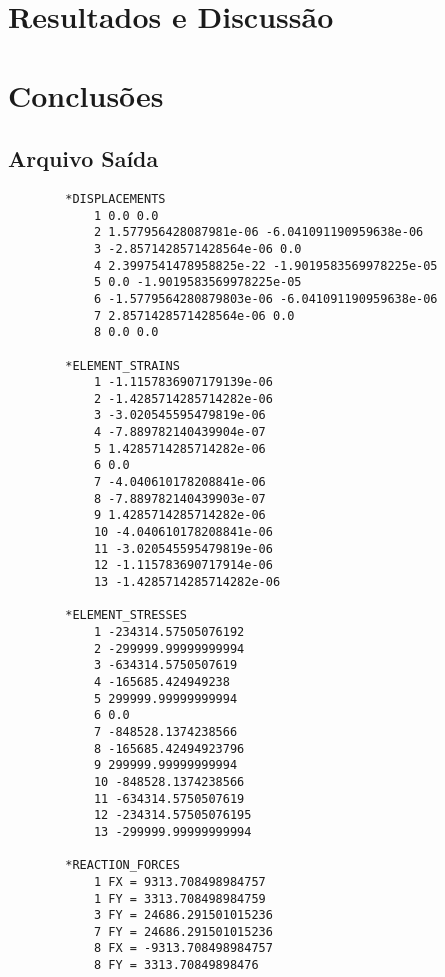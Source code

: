 \documentclass[paper=a4, fontsize=11pt]{scrartcl}
\begin{document}
\section{Resultados e Discussão}




\section{Conclusões}

{}


\begin{appendices}
	\section{Arquivo Saída} \label{appendix:saida}
	
		\begin{lstlisting}
		*DISPLACEMENTS
			1 0.0 0.0
			2 1.577956428087981e-06 -6.041091190959638e-06
			3 -2.8571428571428564e-06 0.0
			4 2.3997541478958825e-22 -1.9019583569978225e-05
			5 0.0 -1.9019583569978225e-05
			6 -1.5779564280879803e-06 -6.041091190959638e-06
			7 2.8571428571428564e-06 0.0
			8 0.0 0.0
		
		*ELEMENT_STRAINS
			1 -1.1157836907179139e-06
			2 -1.4285714285714282e-06
			3 -3.020545595479819e-06
			4 -7.889782140439904e-07
			5 1.4285714285714282e-06
			6 0.0
			7 -4.040610178208841e-06
			8 -7.889782140439903e-07
			9 1.4285714285714282e-06
			10 -4.040610178208841e-06
			11 -3.020545595479819e-06
			12 -1.115783690717914e-06
			13 -1.4285714285714282e-06
		
		*ELEMENT_STRESSES
			1 -234314.57505076192
			2 -299999.99999999994
			3 -634314.5750507619
			4 -165685.424949238
			5 299999.99999999994
			6 0.0
			7 -848528.1374238566
			8 -165685.42494923796
			9 299999.99999999994
			10 -848528.1374238566
			11 -634314.5750507619
			12 -234314.57505076195
			13 -299999.99999999994
		
		*REACTION_FORCES
			1 FX = 9313.708498984757
			1 FY = 3313.708498984759
			3 FY = 24686.291501015236
			7 FY = 24686.291501015236
			8 FX = -9313.708498984757
			8 FY = 3313.70849898476
	\end{lstlisting} 
\end{appendices}

\end{document}
